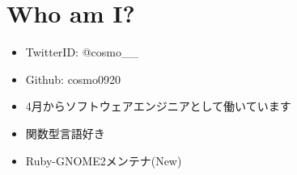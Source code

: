 \section{Who am I?}

\begin{itemize}
\item TwitterID: @cosmo\_\_
\item Github: cosmo0920
\item 4月からソフトウェアエンジニアとして働いています
\item 関数型言語好き
\item Ruby-GNOME2メンテナ(New)
\end{itemize}